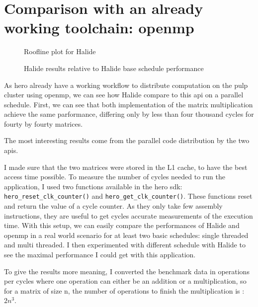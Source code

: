 \section{Comparison with an already working toolchain: \acrshort{openmp}}

\begin{figure}[H]
		\center
	\scalebox{.6}{}
    \caption{Roofline plot for Halide}
	\label{fig:rooflineHalideOpenMP}
\end{figure}
\begin{figure}[H]
		\center
		\scalebox{.6}{}
    \caption{Halide results relative to Halide base schedule performance}
	\label{fig:barPlotHalideOpenMP}
\end{figure}



As \gls{hero} already have a working workflow to distribute computation on the \gls{pulp} cluster using \gls{openmp}, we can see how Halide compare to this \gls{api} on  a parallel schedule.
	First, we can see that both implementation of the matrix multiplication achieve the same parformance, differing only by less than four thousand cycles for fourty by fourty matrices.

	The most interesting results come from the parallel code distribution by the two \glspl{api}.







	I made sure that the two matrices were stored in the L1 cache, to have the best access time possible.
	To measure the number of cycles needed to run the application, I used two functions available in the hero sdk: \texttt{hero\_reset\_clk\_counter()} and \texttt{hero\_get\_clk\_counter()}. These functions reset and return the value of a cycle counter. As they only take few assembly instructions, they are useful to get cycles accurate measurements of the execution time.
	With this setup, we can easily compare the performances of Halide and \gls{openmp} in a real world scenario for at least two basic schedules: single threaded and multi threaded. I then experimented with different schedule with Halide to see the maximal performance I could get with this application.

	To give the results more meaning, I converted the benchmark data in operations per cycles where one operation can either be an addition or a multiplication, so for a matrix of size n, the number of operations to finish the multiplication is : $2n^3$.

